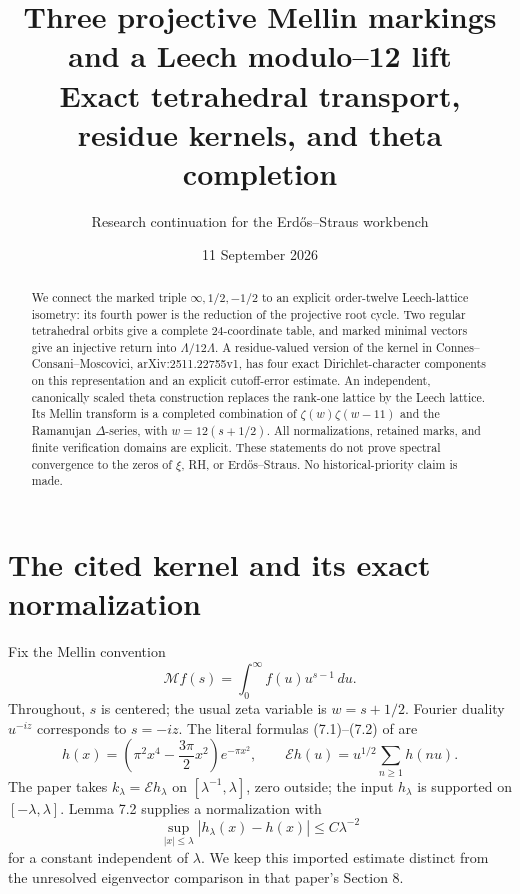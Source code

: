 \documentclass[11pt,reqno]{amsart}
\title[Three Mellin markings and Leech modulo--12]{Three projective Mellin markings and a Leech modulo--12 lift\\
Exact tetrahedral transport, residue kernels, and theta completion}
\author[Research continuation]{Research continuation for the Erd\H{o}s--Straus workbench}
\date{11 September 2026}
\theoremstyle{definition}\newtheorem{definition}[theorem]{Definition}
\theoremstyle{remark}\newtheorem{remark}[theorem]{Remark}
\newcommand{\M}{\mathcal M}\newcommand{\K}{\mathcal K}\newcommand{\E}{\mathcal E}
\begin{document}
\begin{abstract}
We connect the marked triple $\infty,1/2,-1/2$ to an explicit order-twelve Leech-lattice isometry: its fourth power is the reduction of the projective root cycle. Two regular tetrahedral orbits give a complete $24$-coordinate table, and marked minimal vectors give an injective return into $\Lambda/12\Lambda$. A residue-valued version of the kernel in Connes--Consani--Moscovici, arXiv:2511.22755v1, has four exact Dirichlet-character components on this representation and an explicit cutoff-error estimate. An independent, canonically scaled theta construction replaces the rank-one lattice by the Leech lattice. Its Mellin transform is a completed combination of $\zeta(w)\zeta(w-11)$ and the Ramanujan $\Delta$-series, with $w=12(s+1/2)$. All normalizations, retained marks, and finite verification domains are explicit. These statements do not prove spectral convergence to the zeros of $\xi$, RH, or Erd\H{o}s--Straus. No historical-priority claim is made.
\end{abstract}
\maketitle

\section{The cited kernel and its exact normalization}
Fix the Mellin convention
\[
\M f(s)=\int_0^\infty f(u)u^{s-1}\,du.
\]
Throughout, $s$ is centered; the usual zeta variable is $w=s+1/2$. Fourier duality $u^{-iz}$ corresponds to $s=-iz$. The literal formulas (7.1)--(7.2) of \cite{CCM} are
\begin{equation}\label{eq:source}
h(x)=\left(\pi^2x^4-\frac{3\pi}{2}x^2\right)e^{-\pi x^2},
\qquad \E h(u)=u^{1/2}\sum_{n\ge1}h(nu).
\end{equation}
The paper takes $k_\lambda=\E h_\lambda$ on $[\lambda^{-1},\lambda]$, zero outside; the input $h_\lambda$ is supported on $[-\lambda,\lambda]$. Lemma 7.2 supplies a normalization with
\begin{equation}\label{eq:approx}
\sup_{|x|\le\lambda}|h_\lambda(x)-h(x)|\le C\lambda^{-2}
\end{equation}
for a constant independent of $\lambda$. We keep this imported estimate distinct from the unresolved eigenvector comparison in that paper's Section 8.
\end{document}
